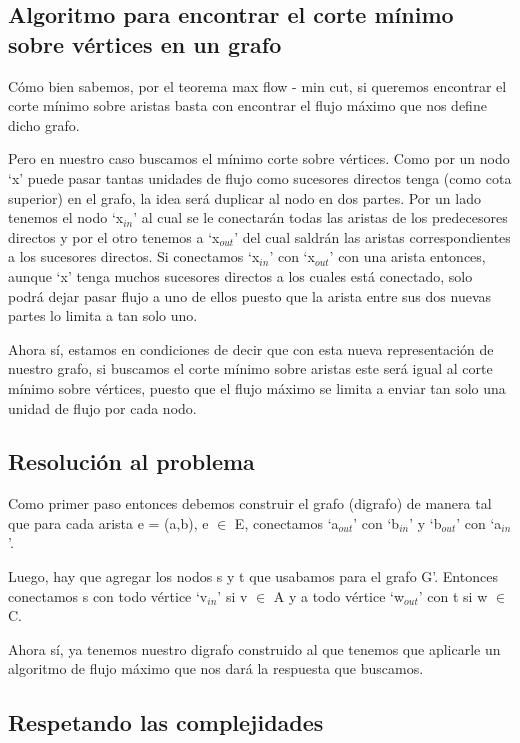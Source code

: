 \subsection{Algoritmo para encontrar el corte mínimo sobre vértices en un grafo}

Cómo bien sabemos, por el teorema max flow - min cut, si queremos encontrar el corte mínimo sobre aristas basta con encontrar el flujo máximo que nos define dicho grafo.

Pero en nuestro caso buscamos el mínimo corte sobre vértices. Como por un nodo `x' puede pasar tantas unidades de flujo como sucesores directos tenga (como cota superior) en el grafo, la idea será duplicar al nodo en dos partes. Por un lado tenemos el nodo `x$_{in}$' al cual se le conectarán todas las aristas de los predecesores directos y por el otro tenemos a `x$_{out}$' del cual saldrán las aristas correspondientes a los sucesores directos. Si conectamos `x$_{in}$' con `x$_{out}$' con una arista entonces, aunque `x' tenga muchos sucesores directos a los cuales está conectado, solo podrá dejar pasar flujo a uno de ellos puesto que la arista entre sus dos nuevas partes lo limita a tan solo uno.

Ahora sí, estamos en condiciones de decir que con esta nueva representación de nuestro grafo, si buscamos el corte mínimo sobre aristas este será igual al corte mínimo sobre vértices, puesto que el flujo máximo se limita a enviar tan solo una unidad de flujo por cada nodo.

\subsection{Resolución al problema}

Como primer paso entonces debemos construir el grafo (digrafo) de manera tal que para cada arista e = (a,b), e $\in$ E, conectamos `a$_{out}$' con `b$_{in}$' y `b$_{out}$' con `a$_{in}$'.

Luego, hay que agregar los nodos s y t que usabamos para el grafo G'. Entonces conectamos s con todo vértice `v$_{in}$' si v $\in$ A y a todo vértice `w$_{out}$' con t si w $\in$ C.

Ahora sí, ya tenemos nuestro digrafo construido al que tenemos que aplicarle un algoritmo de flujo máximo que nos dará la respuesta que buscamos.

\subsection{Respetando las complejidades}

